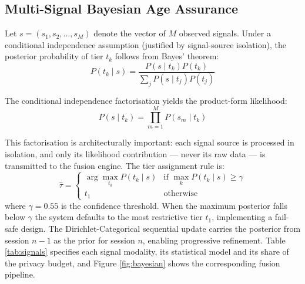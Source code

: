 \documentclass[fleqn,10pt]{wlscirep}
\begin{document}
\subsection*{Multi-Signal Bayesian Age Assurance}

Let $s = (s_1, s_2, \ldots, s_M)$ denote the vector of $M$ observed signals. Under a conditional independence assumption (justified by signal-source isolation), the posterior probability of tier $t_k$ follows from Bayes' theorem:
\begin{equation}
P(t_k \mid s) = \frac{P(s \mid t_k) P(t_k)}{\sum_j P(s \mid t_j) P(t_j)}
\end{equation}

The conditional independence factorisation yields the product-form likelihood:
\begin{equation}
P(s \mid t_k) = \prod_{m=1}^{M} P(s_m \mid t_k)
\end{equation}

This factorisation is architecturally important: each signal source is processed in isolation, and only its likelihood contribution --- never its raw data --- is transmitted to the fusion engine. The tier assignment rule is:
\begin{equation}
\hat{\tau} = \begin{cases} \arg\max_{t_k} P(t_k \mid s) & \text{if } \max_k P(t_k \mid s) \geq \gamma \\ t_1 & \text{otherwise} \end{cases}
\end{equation}
where $\gamma = 0.55$ is the confidence threshold. When the maximum posterior falls below $\gamma$ the system defaults to the most restrictive tier $t_1$, implementing a fail-safe design. The Dirichlet-Categorical sequential update carries the posterior from session $n-1$ as the prior for session $n$, enabling progressive refinement. Table \ref{tab:signals} specifies each signal modality, its statistical model and its share of the privacy budget, and Figure \ref{fig:bayesian} shows the corresponding fusion pipeline.
\end{document}
